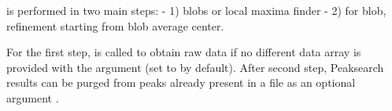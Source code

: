 \documentclass[letterpaper,10pt,english]{sphinxmanual}
\begin{document}
%
\begin{sphinxVerbatim}[commandchars=\\\{\}]
 
\end{sphinxVerbatim}



%
\begin{sphinxVerbatim}[commandchars=\\\{\}]
\end{sphinxVerbatim}

 is performed in two main steps: - 1) blobs or local
maxima finder - 2) for blob, refinement starting from blob average
center.

For the first step,  is called to obtain raw data if
no different data array is provided with the argument
 (set to  by default). After second
step, Peaksearch results can be purged from peaks already present in a
file as an optional argument .
\end{document}
